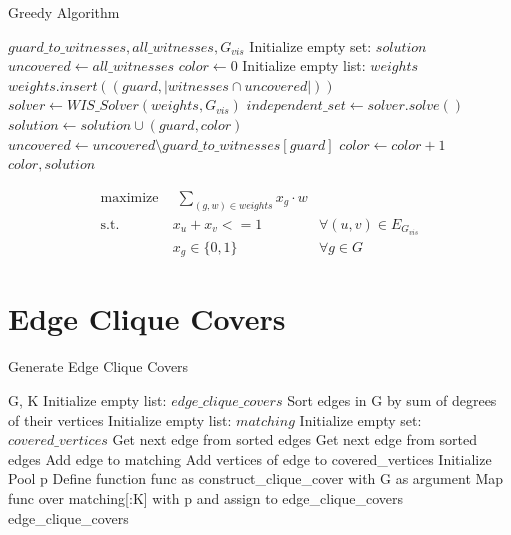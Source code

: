 \begin{algorithm}
\caption{Greedy Algorithm}\label{alg:greedy}
\begin{algorithmic}[1]
\REQUIRE $guard\_to\_witnesses, all\_witnesses, G_{vis}$
\STATE Initialize empty set: $solution$
\STATE $uncovered\gets all\_witnesses$
\STATE $color\gets 0$
    \STATE Initialize empty list: $weights$
        \STATE $weights.insert((guard, |witnesses\cap uncovered|))$
    \ENDFOR
    \STATE $solver\gets WIS\_Solver(weights, G_{vis})$
    \STATE $independent\_set\gets solver.solve()$
        \STATE $solution\gets solution\cup (guard, color)$
        \STATE $uncovered\gets uncovered\setminus guard\_to\_witnesses[guard]$
    \ENDFOR 
    \STATE $color\gets color + 1$
\ENDWHILE
\RETURN $color, solution$
\end{algorithmic}
\end{algorithm}

\begin{align}
\label{eq_MIP:f.0} \mbox{maximize}~& \;\sum_{(g, w)\in weights} x_{g}\cdot w& \\
\label{eq_MIP:f.1} \mbox{s.t. } &x_{u} + x_{v} <= 1 & \forall (u,v) \in E_{G_{vis}}\\
\label{eq_MIP:f.6}& x_{g} \in \{0,1\} & \forall g\in G
\end{align}

\section{Edge Clique Covers}

\begin{algorithm}
\caption{Generate Edge Clique Covers}
\begin{algorithmic}[1]
\REQUIRE G, K
\STATE Initialize empty list: $edge\_clique\_covers$
\STATE Sort edges in G by sum of degrees of their vertices
\STATE Initialize empty list: $matching$
\STATE Initialize empty set: $covered\_vertices$
    \STATE Get next edge from sorted edges
        \STATE Get next edge from sorted edges
    \ENDWHILE
    \STATE Add edge to matching
    \STATE Add vertices of edge to covered\_vertices
\ENDFOR
\STATE Initialize Pool p
\STATE Define function func as construct\_clique\_cover with G as argument
\STATE Map func over matching[:K] with p and assign to edge\_clique\_covers
\RETURN edge\_clique\_covers
\end{algorithmic}
\end{algorithm}

